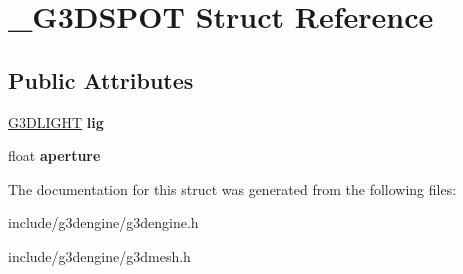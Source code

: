 \hypertarget{struct__G3DSPOT}{}\section{\+\_\+\+G3\+D\+S\+P\+OT Struct Reference}
\label{struct__G3DSPOT}
\subsection*{Public Attributes}
\begin{DoxyCompactItemize}
\item 
\mbox{\label{struct__G3DSPOT_a144ad34e0774756420acd89ba8972617}} 
\hyperlink{struct__G3DLIGHT}{G3\+D\+L\+I\+G\+HT} {\bfseries lig}
\item 
\mbox{\label{struct__G3DSPOT_ab0bf8fb11b0d506db7f735a485609e39}} 
float {\bfseries aperture}
\end{DoxyCompactItemize}


The documentation for this struct was generated from the following files\+:\begin{DoxyCompactItemize}
\item 
include/g3dengine/g3dengine.\+h\item 
include/g3dengine/g3dmesh.\+h\end{DoxyCompactItemize}
